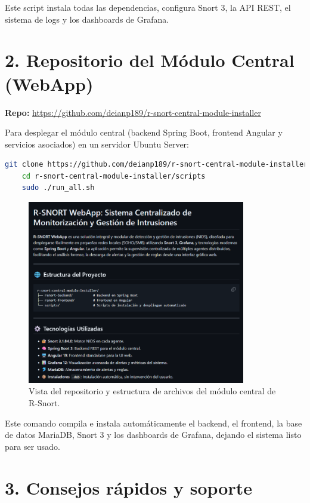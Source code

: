 \documentclass[11pt,a4paper,twoside]{report}
\begin{document}
Este script instala todas las dependencias, configura Snort 3, la API REST, el sistema de logs y los dashboards de Grafana.

\section*{2. Repositorio del Módulo Central (WebApp)}

\textbf{Repo:} \url{https://github.com/deianp189/r-snort-central-module-installer}

Para desplegar el módulo central (backend Spring Boot, frontend Angular y servicios asociados) en un servidor Ubuntu Server:

\begin{lstlisting}[language=bash]
	git clone https://github.com/deianp189/r-snort-central-module-installer.git
	cd r-snort-central-module-installer/scripts
	sudo ./run_all.sh
\end{lstlisting}

\begin{figure}[H]
	\centering
	\includegraphics[width=0.85\textwidth]{apendix_web/1.png}
	\caption{Vista del repositorio y estructura de archivos del módulo central de R-Snort.}
\end{figure}

Este comando compila e instala automáticamente el backend, el frontend, la base de datos MariaDB, Snort 3 y los dashboards de Grafana, dejando el sistema listo para ser usado.

\section*{3. Consejos rápidos y soporte}
\end{document}
